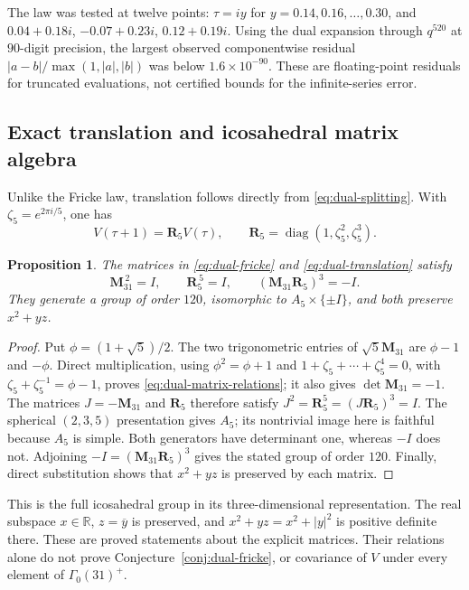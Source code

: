 \documentclass[11pt,reqno]{amsart}
\newcommand{\RR}{\mathbb R}
\newcommand{\diag}{\operatorname{diag}}
\newtheorem{proposition}[theorem]{Proposition}
\theoremstyle{remark}
\numberwithin{equation}{section}
\begin{document}
The law was tested at twelve points: $\tau=iy$ for
$y=0.14,0.16,\ldots,0.30$, and
$0.04+0.18i$, $-0.07+0.23i$, $0.12+0.19i$.
Using the dual expansion through $q^{520}$ at $90$-digit precision,
the largest observed componentwise residual
$|a-b|/\max(1,|a|,|b|)$ was below $1.6\times10^{-90}$.
These are floating-point residuals for truncated evaluations, not
certified bounds for the infinite-series error.

\subsection{Exact translation and icosahedral matrix algebra}
Unlike the Fricke law, translation follows directly from
\eqref{eq:dual-splitting}. With $\zeta_5=e^{2\pi i/5}$, one has
\begin{equation}\label{eq:dual-translation}
 V(\tau+1)=\mathbf R_5V(\tau),\qquad
 \mathbf R_5=\diag(1,\zeta_5^2,\zeta_5^3).
\end{equation}

\begin{proposition}\label{prop:dual-matrices}
The matrices in \eqref{eq:dual-fricke} and
\eqref{eq:dual-translation} satisfy
\begin{equation}\label{eq:dual-matrix-relations}
 \mathbf M_{31}^{\,2}=I,\qquad \mathbf R_5^{\,5}=I,\qquad
 (\mathbf M_{31}\mathbf R_5)^3=-I.
\end{equation}
They generate a group of order $120$, isomorphic to
$A_5\times\{\pm I\}$, and both preserve $x^2+yz$.
\end{proposition}
\begin{proof}
Put $\phi=(1+\sqrt5)/2$. The two trigonometric entries of
$\sqrt5\mathbf M_{31}$ are $\phi-1$ and $-\phi$.
Direct multiplication, using $\phi^2=\phi+1$ and
$1+\zeta_5+\cdots+\zeta_5^4=0$, with
$\zeta_5+\zeta_5^{-1}=\phi-1$, proves
\eqref{eq:dual-matrix-relations}; it also gives
$\det\mathbf M_{31}=-1$. The matrices
$J=-\mathbf M_{31}$ and $\mathbf R_5$ therefore satisfy
$J^2=\mathbf R_5^5=(J\mathbf R_5)^3=I$.
The spherical $(2,3,5)$ presentation gives $A_5$; its nontrivial
image here is faithful because $A_5$ is simple.
Both generators have determinant one, whereas $-I$ does not.
Adjoining $-I=(\mathbf M_{31}\mathbf R_5)^3$ gives the stated
group of order $120$. Finally, direct substitution shows that
$x^2+yz$ is preserved by each matrix.
\end{proof}
This is the full icosahedral group in its three-dimensional
representation. The real subspace $x\in\RR$, $z=\overline y$
is preserved, and $x^2+yz=x^2+|y|^2$ is positive definite there.
These are proved statements about the explicit matrices. Their
relations alone do not prove Conjecture~\ref{conj:dual-fricke}, or
covariance of $V$ under every element of $\Gamma_0(31)^+$.
\end{document}
